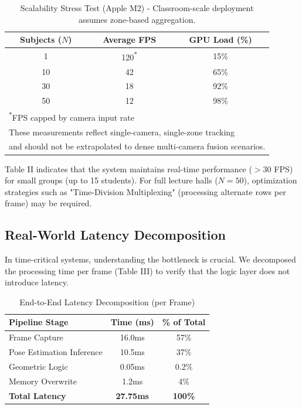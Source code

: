 \documentclass[conference]{IEEEtran}
\begin{document}
\begin{table}[htbp]
\caption{Scalability Stress Test (Apple M2) - Classroom-scale deployment assumes zone-based aggregation.}
\begin{center}
\begin{tabular}{ccc}
\toprule
\textbf{Subjects ($N$)} & \textbf{Average FPS} & \textbf{GPU Load (\%)} \\
\midrule
1 & 120\textsuperscript{*} & 15\% \\
10 & 42 & 65\% \\
30 & 18 & 92\% \\
50 & 12 & 98\% \\
\bottomrule
\multicolumn{3}{l}{\textsuperscript{*}\footnotesize{FPS capped by camera input rate}} \\
\multicolumn{3}{l}{\footnotesize{These measurements reflect single-camera, single-zone tracking}} \\
\multicolumn{3}{l}{\footnotesize{and should not be extrapolated to dense multi-camera fusion scenarios.}}
\end{tabular}
\end{center}
\end{table}

Table II indicates that the system maintains real-time performance ($>30$ FPS) for small groups (up to 15 students). For full lecture halls ($N=50$), optimization strategies such as "Time-Division Multiplexing" (processing alternate rows per frame) may be required.

\subsection{Real-World Latency Decomposition}
In time-critical systems, understanding the bottleneck is crucial. We decomposed the processing time per frame (Table III) to verify that the logic layer does not introduce latency.

\begin{table}[htbp]
\caption{End-to-End Latency Decomposition (per Frame)}
\begin{center}
\begin{tabular}{lcc}
\toprule
\textbf{Pipeline Stage} & \textbf{Time (ms)} & \textbf{\% of Total} \\
\midrule
Frame Capture & 16.0ms & 57\% \\
Pose Estimation Inference & 10.5ms & 37\% \\
Geometric Logic & 0.05ms & 0.2\% \\
Memory Overwrite & 1.2ms & 4\% \\
\textbf{Total Latency} & \textbf{27.75ms} & \textbf{100\%} \\
\bottomrule
\end{tabular}
\end{center}
\end{table}
\end{document}
